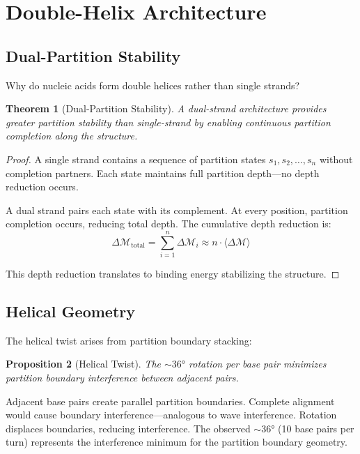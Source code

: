 \documentclass[twocolumn,10pt,a4paper]{article}
\newtheorem{theorem}{Theorem}[section]
\newtheorem{proposition}[theorem]{Proposition}
\theoremstyle{definition}
\theoremstyle{remark}
\newcommand{\Depth}{\mathcal{M}}
\begin{document}
\section{Double-Helix Architecture}
\label{sec:helix}

\subsection{Dual-Partition Stability}

Why do nucleic acids form double helices rather than single strands?

\begin{theorem}[Dual-Partition Stability]
\label{thm:dual}
A dual-strand architecture provides greater partition stability than single-strand by enabling continuous partition completion along the structure.
\end{theorem}

\begin{proof}
A single strand contains a sequence of partition states $s_1, s_2, \ldots, s_n$ without completion partners. Each state maintains full partition depth---no depth reduction occurs.

A dual strand pairs each state with its complement. At every position, partition completion occurs, reducing total depth. The cumulative depth reduction is:
\begin{equation}
    \Delta\Depth_{\text{total}} = \sum_{i=1}^{n} \Delta\Depth_i \approx n \cdot \langle\Delta\Depth\rangle
\end{equation}

This depth reduction translates to binding energy stabilizing the structure.
\end{proof}

\subsection{Helical Geometry}

The helical twist arises from partition boundary stacking:

\begin{proposition}[Helical Twist]
\label{prop:helix}
The $\sim 36°$ rotation per base pair minimizes partition boundary interference between adjacent pairs.
\end{proposition}

Adjacent base pairs create parallel partition boundaries. Complete alignment would cause boundary interference---analogous to wave interference. Rotation displaces boundaries, reducing interference. The observed $\sim 36°$ (10 base pairs per turn) represents the interference minimum for the partition boundary geometry.
\end{document}
